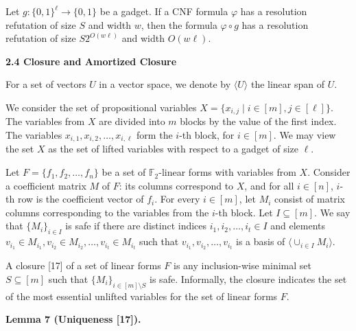Let $g:\{0,1\}^{\ell}\to\{0,1\}$ be a gadget.
If a CNF formula $\varphi$ has a resolution refutation of size $S$ and width $w$,
then the formula $\varphi\circ g$ has a resolution refutation of size
$S2^{O(w\ell)}$ and width $O(w\ell)$.\par



\par\medskip\noindent\textbf{
2.4 Closure and Amortized Closure}\par


For a set of vectors $U$ in a vector space, we denote by $\langle U\rangle$ the linear span of $U$.\par



We consider the set of propositional variables $X=\{x_{i,j}\mid i\in[m],j\in[\ell]\}$.
The variables from $X$ are divided into $m$ blocks by the value of the first index.
The variables $x_{i,1},x_{i,2},\dots,x_{i,\ell}$ form the $i$-th block, for $i\in[m]$.
We may view the set $X$ as the set of lifted variables with respect to a gadget of size $\ell$.\par



Let $F=\{f_{1},f_{2},\dots,f_{n}\}$ be a set of $\mathbb{F}_{2}$-linear forms with variables from $X$.
Consider a coefficient matrix $M$ of $F$: its columns correspond to $X$, and for all $i\in[n]$,
$i$-th row is the coefficient vector of $f_{i}$.
For every $i\in[m]$, let $M_{i}$ consist of matrix columns corresponding to the variables from
the $i$-th block.
Let $I\subseteq[m]$.
We say that $\{M_{i}\}_{i\in I}$ is safe if there are distinct indices $i_{1},i_{2},\dots,i_{t}\in I$
and elements $v_{i_{1}}\in M_{i_{1}},v_{i_{2}}\in M_{i_{2}},\dots,v_{i_{t}}\in M_{i_{t}}$ such that
$v_{i_{1}},v_{i_{2}},\dots,v_{i_{t}}$ is a basis of $\langle\cup_{i\in I}M_{i}\rangle$.\par



A closure [17] of a set of linear forms $F$ is any inclusion-wise minimal
set $S\subseteq[m]$ such that $\{M_{i}\}_{i\in[m]\setminus S}$ is safe.
Informally, the closure indicates the set of the most essential unlifted variables
for the set of linear forms $F$.\par



\par\medskip\noindent\textbf{
Lemma 7 (Uniqueness [17]).
}\par



